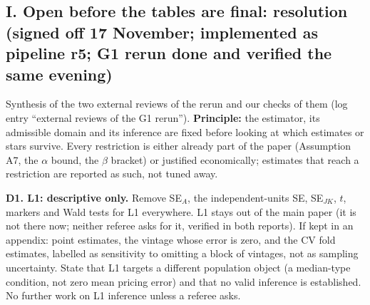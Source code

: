 \documentclass[11pt]{article}
\begin{document}
\subsection*{I. Open before the tables are final: resolution (signed off 17 November; implemented as pipeline r5; G1 rerun done and verified the same evening)}
Synthesis of the two external reviews of the rerun and our checks of them (log entry ``external reviews of the G1 rerun''). \textbf{Principle:} the estimator, its admissible domain and its inference are fixed before looking at which estimates or stars survive. Every restriction is either already part of the paper (Assumption A7, the $\alpha$ bound, the $\beta$ bracket) or justified economically; estimates that reach a restriction are reported as such, not tuned away.

\textbf{D1. L1: descriptive only.} Remove SE$_A$, the independent-units SE, SE$_{JK}$, $t$, markers and Wald tests for L1 everywhere. L1 stays out of the main paper (it is not there now; neither referee asks for it, verified in both reports). If kept in an appendix: point estimates, the vintage whose error is zero, and the CV fold estimates, labelled as sensitivity to omitting a block of vintages, not as sampling uncertainty. State that L1 targets a different population object (a median-type condition, not zero mean pricing error) and that no valid inference is established. No further work on L1 inference unless a referee asks.
\end{document}
